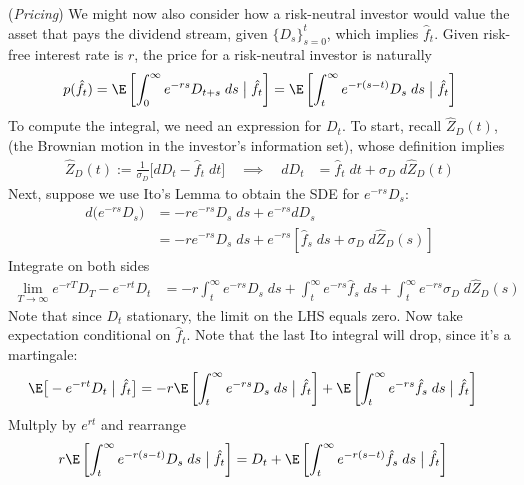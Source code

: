 \documentclass[12pt]{article}
\theoremstyle{plain}
\theoremstyle{definition}
\theoremstyle{remark}
\newcommand{\ra}{\rightarrow}
\begin{document}
\clearpage
(\emph{Pricing})
We might now also consider how a risk-neutral investor would value the
asset that pays the dividend stream, given $\{D_s\}_{s=0}^t$, which
implies $\hat{f}_t$.
Given risk-free interest rate is $r$, the price for a risk-neutral
investor is naturally
\begin{align*}
  p(\hat{f}_t)
  =
  \E\left[
    \int_{0}^\infty e^{-rs}D_{t+s}\;ds
    \;\big|\;\hat{f}_t
  \right]
  =\E\left[\int_t^\infty e^{-r(s-t)}D_s\;ds\;\big|\;\hat{f}_t\right]
\end{align*}
To compute the integral, we need an expression for $D_t$.
To start, recall $\hat{Z}_D(t)$, (the Brownian motion in the investor's
information set), whose definition implies
\begin{align*}
  \hat{Z}_D(t)
  :=
  \frac{1}{\sigma_D}
  \big[
    dD_t-\hat{f}_t\;dt
  \big]
  \quad\implies\quad
  dD_t
  &=
  \hat{f}_t\;dt+\sigma_D\;d\hat{Z}_D(t)
\end{align*}
Next, suppose we use Ito's Lemma to obtain the SDE for $e^{-rs}D_s$:
\begin{align*}
  d\big(e^{-rs} D_s\big)
  &=
  -re^{-rs}D_s\;ds
  + e^{-rs} dD_s
  \\
  &=
  -re^{-rs}D_s\;ds
  + e^{-rs}
  \left[
  \hat{f}_s\;ds+\sigma_D\;d\hat{Z}_D(s)
  \right]
\end{align*}
Integrate on both sides
\begin{align*}
  \lim_{T\ra\infty} e^{-rT} D_T
  -
  e^{-rt} D_t
  &=
  -r\int_t^\infty e^{-rs}D_s\;ds
  +
  \int_t^\infty
  e^{-rs} \hat{f}_s\;ds
  +
  \int_t^\infty
  e^{-rs}
  \sigma_D\;d\hat{Z}_D(s)
\end{align*}
Note that since $D_t$ stationary, the limit on the LHS equals zero.
Now take expectation conditional on $\hat{f}_t$.
Note that the last Ito integral will drop, since it's a martingale:
\begin{align*}
  \E\big[
  - e^{-rt} D_t
  \;\big|\;\hat{f}_t\big]
  &=
  -r\E\left[\int_t^\infty e^{-rs}D_s\;ds\;\big|\;\hat{f}_t\right]
  +
  \E\left[
  \int_t^\infty
  e^{-rs}
  \hat{f}_s\;ds\;\big|\;\hat{f}_t\right]
\end{align*}
Multply by $e^{rt}$ and rearrange
\begin{align*}
  r\E\left[\int_t^\infty e^{-r(s-t)}D_s\;ds\;\big|\;\hat{f}_t\right]
  &=
  D_t
  +
  \E\left[ \int_t^\infty e^{-r(s-t)}
  \hat{f}_s\;ds\;\big|\;\hat{f}_t\right]
\end{align*}
\end{document}
